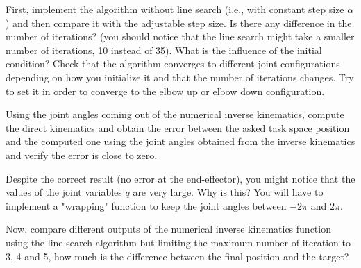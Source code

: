 \documentclass[11pt]{article}
\begin{document}
First, implement the algorithm without line search (i.e., with constant step size $\alpha$) and then compare it with the adjustable step size. Is there any difference in the number of iterations?  (you should notice that the line search might take a smaller number of iterations, 10 instead of 35). What is the influence of the initial condition? 
Check that the algorithm converges to different joint configurations depending on how you initialize it and that the number of iterations changes. 
Try to set it in order to converge to the elbow up or elbow down configuration.  

Using the joint angles coming out of the numerical inverse kinematics, compute the direct kinematics and obtain the error between the asked task space position and the computed one using the joint angles obtained from the inverse kinematics and verify the error is close to zero.  
 

Despite the correct result (no error at the end-effector), 
you might notice that the values of the joint variables $q$ are very large. Why is this? 
You will have to implement a "wrapping" function to keep the joint angles between $-2\pi$ and $2\pi$. 

 
Now,  compare different outputs of the numerical inverse kinematics function  using the line search algorithm but limiting the maximum number of iteration to 3, 4 and 5, how much is the difference between the final position and the target? 

\end{document}
